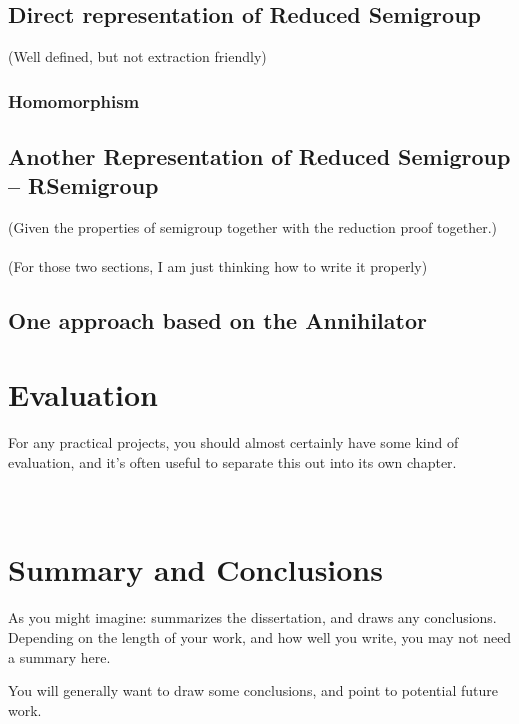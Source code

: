 \documentclass[a4paper,12pt,twoside,openright]{report}
\begin{document}
\section{Direct representation of Reduced Semigroup}
(Well defined, but not extraction friendly)\
\subsection{Homomorphism}
\section{Another Representation of Reduced Semigroup -- RSemigroup}
(Given the properties of semigroup together with the reduction proof together.)\\\\
(For those two sections, I am just thinking how to write it properly)
\section{One approach based on the Annihilator}
\chapter{Evaluation} 

For any practical projects, you should almost certainly have
some kind of evaluation, and it's often useful to separate 
this out into its own chapter. \\\\\\


\chapter{Summary and Conclusions} 

As you might imagine: summarizes the dissertation, and draws 
any conclusions. Depending on the length of your work, and 
how well you write, you may not need a summary here. 

You will generally want to draw some conclusions, and point
to potential future work. 




\appendix
\singlespacing

 

\end{document}

